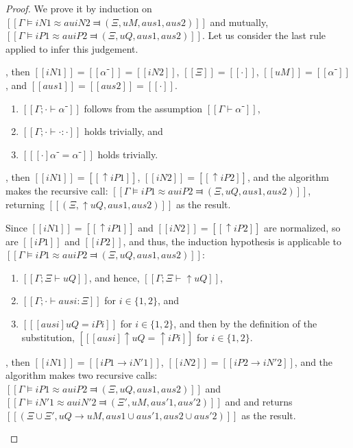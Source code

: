 \begin{proof}
    We prove it by induction on 
    $[[Γ ⊨ iN1 ≈au iN2 ⫤ (Ξ, uM, aus1, aus2)]]$
    and mutually, $[[Γ ⊨ iP1 ≈au iP2 ⫤ (Ξ, uQ, aus1, aus2)]]$.
    Let us consider the last rule applied to infer this judgement.
    \begin{caseof}
        \item {}, then $[[iN1]] = [[α⁻]] = [[iN2]]$,
              $[[Ξ]] = [[·]]$, $[[uM]] = [[α⁻]]$, and $[[aus1]] = [[aus2]] = [[·]]$.
            \begin{enumerate}
                \item $[[Γ ; · ⊢ α⁻]]$ follows from the assumption $[[Γ ⊢ α⁻]]$,
                \item $[[Γ ; · ⊢ · : ·]]$ holds trivially, and
                \item $[[ [·] α⁻ = α⁻ ]]$ holds trivially.
            \end{enumerate}
        \item \label{case:anti-unification-soundness:shiftu}
         , then $[[iN1]] = [[↑iP1]]$,
                $[[iN2]] = [[↑iP2]]$, and the algorithm makes the recursive call:
                $[[Γ ⊨ iP1 ≈au iP2 ⫤ (Ξ, uQ, aus1, aus2)]]$, 
                returning $[[(Ξ, ↑uQ, aus1, aus2)]]$ as the result.

                Since $[[iN1]] = [[↑iP1]]$ and $[[iN2]] = [[↑iP2]]$ are normalized, 
                so are $[[iP1]]$ and $[[iP2]]$, and thus, the induction hypothesis 
                is applicable to $[[Γ ⊨ iP1 ≈au iP2 ⫤ (Ξ, uQ, aus1, aus2)]]$:
                \begin{enumerate}
                    \item $[[Γ ; Ξ ⊢ uQ]]$, and hence, $[[Γ ; Ξ ⊢ ↑uQ]]$,
                    \item $[[Γ ; · ⊢ ausi : Ξ]]$ for $i \in \{1,2\}$, and
                    \item $[[ [ausi] uQ = iPi ]]$ for $i \in \{1,2\}$, and then by 
                    the definition of the substitution, $[[ [ausi] ↑uQ = ↑iPi ]]$ for $i \in \{1,2\}$.
                \end{enumerate}

        \item {}, then $[[iN1]] = [[iP1 → iN'1]]$,
                $[[iN2]] = [[iP2 → iN'2]]$, and the algorithm makes two recursive calls:
                $[[Γ ⊨ iP1 ≈au iP2 ⫤ (Ξ, uQ, aus1, aus2)]]$ and
                $[[Γ ⊨ iN'1 ≈au iN'2 ⫤ (Ξ', uM, aus'1, aus'2)]]$ and
                and returns $[[(Ξ ∪ Ξ', uQ → uM, aus1 ∪ aus'1, aus2 ∪ aus'2)]]$ as the result.
                

\end{caseof}
\end{proof}
